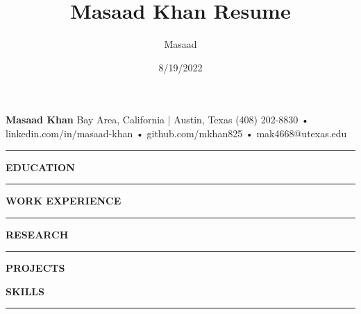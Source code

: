 \documentclass[12pt, a4paper]{article}
\title{Masaad Khan Resume}
\author{Masaad}
\date{8/19/2022}
\newcommand\jobDist{-2 mm}
\newcommand\titleheadersize{11}
\begin{document}
%
\begin{center}
  {\fontsize{20}{24}\selectfont \textbf{Masaad Khan}}\newline
  {\fontsize{\titleheadersize}{14}\selectfont Bay Area, California} | {\fontsize{\titleheadersize}{14}\selectfont Austin, Texas}\newline
  {\fontsize{\titleheadersize}{14}\selectfont (408) 202-8830} • {\fontsize{\titleheadersize}{14}\selectfont linkedin.com/in/masaad-khan} • {\fontsize{\titleheadersize}{14}\selectfont github.com/mkhan825} • {\fontsize{\titleheadersize}{14}\selectfont mak4668@utexas.edu}
\end{center}
%
%
\vspace{-8 mm}
%
%
\rule{18.5cm}{0.4pt}\vspace{-0.75mm}
\noindent\textbf{{\fontsize{12}{14}\selectfont EDUCATION}}
\vspace{-1mm}\newline

\vspace{-1mm}
%
%
\noindent\rule{18.5cm}{0.4pt}
\noindent\textbf{{\fontsize{12}{14}\selectfont WORK EXPERIENCE}}
\vspace{-0.25mm}\newline
%

\vspace{\jobDist}

\vspace{\jobDist}

\vspace{-1mm}
%
%
\noindent\rule{18.5cm}{0.4pt}
\noindent\textbf{{\fontsize{12}{14}\selectfont RESEARCH}}\newline
\vspace{-5.5mm}\newline
%

\vspace{0cm}
%
%
\noindent\rule{18.5cm}{0.4pt}
\noindent\textbf{{\fontsize{12}{14}\selectfont PROJECTS}}\newline
\vspace{-0.8cm}\newline
%

\vspace{0cm}
%

\vspace{0cm}
%
%
\noindent\textbf{{\fontsize{12}{14}\selectfont SKILLS}}\newline
\vspace{-0.8cm}\newline
\rule{18.5cm}{0.4pt}
%
%

\vspace{0cm}
\end{document}
